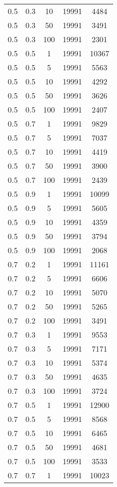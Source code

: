 \begin{appendices}
\begin{longtable}{|c|c|c|c|c|}
		0.5 & 0.3 & 10  & 19991 & 4484  \\
		0.5 & 0.3 & 50  & 19991 & 3491  \\
		0.5 & 0.3 & 100 & 19991 & 2301  \\ \hline
		0.5 & 0.5 & 1   & 19991 & 10367 \\
		0.5 & 0.5 & 5   & 19991 & 5563  \\
		0.5 & 0.5 & 10  & 19991 & 4292  \\
		0.5 & 0.5 & 50  & 19991 & 3626  \\
		0.5 & 0.5 & 100 & 19991 & 2407  \\ \hline
		0.5 & 0.7 & 1   & 19991 & 9829  \\
		0.5 & 0.7 & 5   & 19991 & 7037  \\
		0.5 & 0.7 & 10  & 19991 & 4419  \\
		0.5 & 0.7 & 50  & 19991 & 3900  \\
		0.5 & 0.7 & 100 & 19991 & 2439  \\ \hline
		0.5 & 0.9 & 1   & 19991 & 10099 \\
		0.5 & 0.9 & 5   & 19991 & 5605  \\
		0.5 & 0.9 & 10  & 19991 & 4359  \\
		0.5 & 0.9 & 50  & 19991 & 3794  \\
		0.5 & 0.9 & 100 & 19991 & 2068  \\ \hline
		0.7 & 0.2 & 1   & 19991 & 11161 \\
		0.7 & 0.2 & 5   & 19991 & 6606  \\
		0.7 & 0.2 & 10  & 19991 & 5070  \\
		0.7 & 0.2 & 50  & 19991 & 5265  \\
		0.7 & 0.2 & 100 & 19991 & 3491  \\ \hline
		0.7 & 0.3 & 1   & 19991 & 9553  \\
		0.7 & 0.3 & 5   & 19991 & 7171  \\
		0.7 & 0.3 & 10  & 19991 & 5374  \\
		0.7 & 0.3 & 50  & 19991 & 4635  \\
		0.7 & 0.3 & 100 & 19991 & 3724  \\ \hline
		0.7 & 0.5 & 1   & 19991 & 12900 \\
		0.7 & 0.5 & 5   & 19991 & 8568  \\
		0.7 & 0.5 & 10  & 19991 & 6465  \\
		0.7 & 0.5 & 50  & 19991 & 4681  \\
		0.7 & 0.5 & 100 & 19991 & 3533  \\ \hline
		0.7 & 0.7 & 1   & 19991 & 10023 \\

\end{longtable}
\end{appendices}
